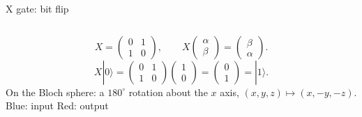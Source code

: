 \begin{frame}{X gate: bit flip}
  \begin{columns}[c]
    \[
      X=\begin{pmatrix}0&1\\1&0\end{pmatrix},\qquad
      X\begin{pmatrix}\alpha\\\beta\end{pmatrix}
       =\begin{pmatrix}\beta\\\alpha\end{pmatrix}.
    \]
    \[
      X|0\rangle=\begin{pmatrix}0&1\\1&0\end{pmatrix}
      \begin{pmatrix}1\\0\end{pmatrix}
      =\begin{pmatrix}0\\1\end{pmatrix}=|1\rangle.
    \]
    On the Bloch sphere: a $180^\circ$ rotation about the $x$ axis,
    $(x,y,z)\mapsto(x,-y,-z)$.
    \centering{}
    \small Blue: input \quad Red: output
  \end{columns}
\end{frame}
